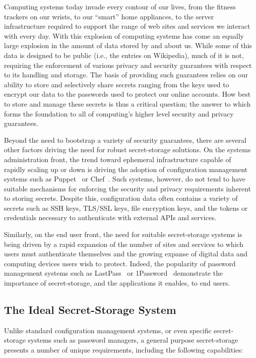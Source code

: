 Computing systems today invade every contour of our lives, from the
fitness trackers on our wrists, to our ``smart'' home appliances, to
the server infrastructure required to support the range of web sites
and services we interact with every day. With this explosion of
computing systems has come an equally large explosion in the amount of
data stored by and about us. While some of this data is designed to be
public (i.e., the entries on Wikipedia), much of it is not, requiring
the enforcement of various privacy and security guarantees with
respect to its handling and storage. The basis of providing such
guarantees relies on our ability to store and selectively share
secrets ranging from the keys used to encrypt our data to the
passwords used to protect our online accounts. How best to store and
manage these secrets is thus a critical question; the answer to which
forms the foundation to all of computing's higher level security and
privacy guarantees.

Beyond the need to bootstrap a variety of security guarantees, there
are several other factors driving the need for robust secret-storage
solutions. On the systems administration front, the trend toward
ephemeral infrastructure capable of rapidly scaling up or down is
driving the adoption of configuration management systems such as
Puppet~\cite{puppet} or Chef~\cite{chef}. Such systems, however, do
not tend to have suitable mechanisms for enforcing the security and
privacy requirements inherent to storing secrets. Despite this,
configuration data often contains a variety of secrets such as SSH
keys, TLS/SSL keys, file encryption keys, and the tokens or
credentials necessary to authenticate with external APIs and services.

Similarly, on the end user front, the need for suitable secret-storage
systems is being driven by a rapid expansion of the number of sites
and services to which users must authenticate themselves and the
growing expanse of digital data and computing devices users wish to
protect. Indeed, the popularity of password management systems such as
LastPass~\cite{lastpass} or 1Password~\cite{onepassword} demonstrate
the importance of secret-storage, and the applications it enables, to
end users.

\subsection{The Ideal Secret-Storage System}

Unlike standard configuration management systems, or even specific
secret-storage systems such as password managers, a general purpose
secret-storage presents a number of unique requirements, including the
following capabilities:

